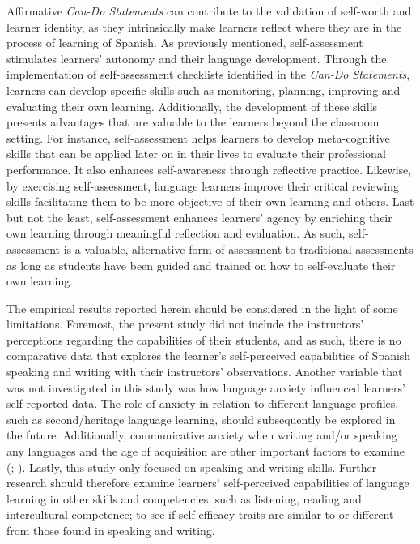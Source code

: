 \documentclass[output=paper]{langscibook}
\begin{document}
Affirmative \textit{Can-Do Statements} can contribute to the validation of self-worth and learner identity, as they intrinsically make learners reflect where they are in the process of learning of Spanish. As previously mentioned, self-assessment stimulates learners’ autonomy and their language development. Through the implementation of self-assessment checklists identified in the \textit{Can-Do Statements}, learners can develop specific skills such as monitoring, planning, improving and evaluating their own learning. Additionally, the development of these skills pre\-sents advantages that are valuable to the learners beyond the classroom setting. For instance, self-assessment helps learners to develop meta-cognitive skills that can be applied later on in their lives to evaluate their professional performance. It also enhances self-awareness through reflective practice. Likewise, by exercising self-assessment, language learners improve their critical reviewing skills facilitating them to be more objective of their own learning and others. Last but not the least, self-assessment enhances learners’ agency by enriching their own learning through meaningful reflection and evaluation. As such, self-assessment is a valuable, alternative form of assessment to traditional assessments as long as students have been guided and trained on how to self-evaluate their own learning.

The empirical results reported herein should be considered in the light of some limitations. Foremost, the present study did not include the instructors’ perceptions regarding the capabilities of their students, and as such, there is no comparative data that explores the learner’s self-perceived capabilities of Spanish speaking and writing with their instructors’ observations. Another variable that was not investigated in this study was how language anxiety influenced learners’ self-reported data. The role of anxiety in relation to different language profiles, such as second/heritage language learning, should subsequently be explored in the future. Additionally, communicative anxiety when writing and/or speaking any languages and the age of acquisition are other important factors to examine (\citealt{DewaeleFurnham2008}; \citealt{SparksGanschow1991}). Lastly, this study only focused on speaking and writing skills. Further research should therefore examine learners’ self-perceived capabilities of language learning in other skills and competencies, such as listening, reading and intercultural competence; to see if self-efficacy traits are similar to or different from those found in speaking and writing.
\end{document}
